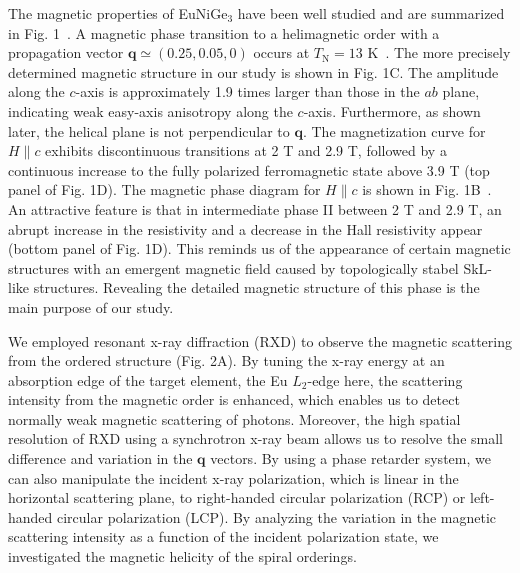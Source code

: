 \documentclass[aps,prb,reprint,superscriptaddress,amsmath,amssymb]{revtex4-2}
\begin{document}
The magnetic properties of EuNiGe$_3$ have been well studied and are summarized in Fig. 1~\cite{Maurya14,Fabreges16,Kakihana17,Iha20}. 
A magnetic phase transition to a helimagnetic order with a propagation vector $\bm{q}\simeq (0.25, 0.05, 0)$ occurs at $T_{\text{N}}=13$ K~\cite{Fabreges16}. 
The more precisely determined magnetic structure in our study is shown in Fig. 1C. The amplitude along the $c$-axis is approximately 1.9 times larger than those in the $ab$ plane, indicating weak easy-axis anisotropy along the $c$-axis. 
Furthermore, as shown later, the helical plane is not perpendicular to $\bm{q}$. 
The magnetization curve for $H \parallel c$ exhibits discontinuous transitions at 2 T and 2.9 T, followed by a continuous increase to the fully polarized ferromagnetic state above 3.9 T (top panel of Fig. 1D). The magnetic phase diagram for $H \parallel c$ is shown in Fig. 1B~\cite{Kakihana17}. 
An attractive feature is that in intermediate phase II between 2 T and 2.9 T, an abrupt increase in the resistivity and a decrease in the Hall resistivity appear (bottom panel of Fig. 1D). 
This reminds us of the appearance of certain magnetic structures with an emergent magnetic field caused by topologically stabel SkL-like structures. 
Revealing the detailed magnetic structure of this phase is the main purpose of our study. 


We employed resonant x-ray diffraction (RXD) to observe the magnetic scattering from the ordered structure (Fig. 2A). 
By tuning the x-ray energy at an absorption edge of the target element, the Eu $L_2$-edge here, the scattering intensity from the magnetic order is enhanced, which enables us to detect normally weak magnetic scattering of photons. 
Moreover, the high spatial resolution of RXD using a synchrotron x-ray beam allows us to resolve the small difference and variation in the $\bm{q}$ vectors. 
By using a phase retarder system, we can also manipulate the incident x-ray polarization, which is linear in the horizontal scattering plane, to right-handed circular polarization (RCP) or left-handed circular polarization (LCP). By analyzing the variation in the magnetic scattering intensity as a function of the incident polarization state, we investigated the magnetic helicity of the spiral orderings.
\end{document}
